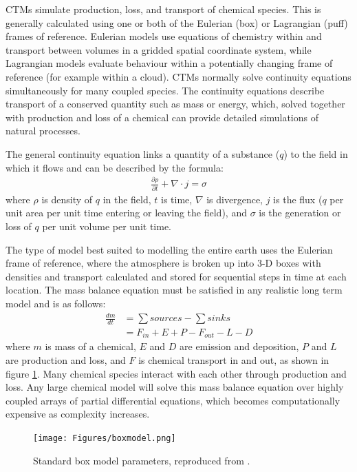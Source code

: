     
    CTMs simulate production, loss, and transport of chemical species.
    This is generally calculated using one or both of the Eulerian (box) or Lagrangian (puff) frames of reference.
    Eulerian models use equations of chemistry within and transport between volumes in a gridded spatial coordinate system, while Lagrangian models evaluate behaviour within a potentially changing frame of reference (for example within a cloud).
    CTMs normally solve continuity equations simultaneously for many coupled species.
    The continuity equations describe transport of a conserved quantity such as mass or energy, which, solved together with production and loss of a chemical can provide detailed simulations of natural processes.
    
    The general continuity equation links a quantity of a substance ($q$) to the field in which it flows and can be described by the formula:
    \begin{align*}
      \frac{\partial \rho}{\partial t} + \nabla \cdot j = \sigma 
    \end{align*}
    where $\rho$ is density of $q$ in the field, $t$ is time, $\nabla$ is divergence, $j$ is the flux ($q$ per unit area per unit time entering or leaving the field), and $\sigma$ is the generation or loss of $q$ per unit volume per unit time.
    
    
    The type of model best suited to modelling the entire earth uses the Eulerian frame of reference, where the atmosphere is broken up into 3-D boxes with densities and transport calculated and stored for sequential steps in time at each location.
    The mass balance equation must be satisfied in any realistic long term model and is as follows: 
    \begin{align*}
      \frac{dm}{dt} & = \sum{sources}-\sum{sinks} \\
                    & = F_{in} + E + P - F_{out} - L - D 
    \end{align*}
    where $m$ is mass of a chemical, $E$ and $D$ are emission and deposition, $P$ and $L$ are production and loss, and $F$ is chemical transport in and out, as shown in figure \ref{LR:Models:fig_boxmodel}.
    Many chemical species interact with each other through production and loss. 
    Any large chemical model will solve this mass balance equation over highly coupled arrays of partial differential equations, which becomes computationally expensive as complexity increases.
    
    \begin{figure}
      \texttt{[image: Figures/boxmodel.png]}
      \caption{ %
        Standard box model parameters, reproduced from \textcite{Jacob_1999_book}. }
      \label{LR:Models:fig_boxmodel}
    \end{figure}
    
